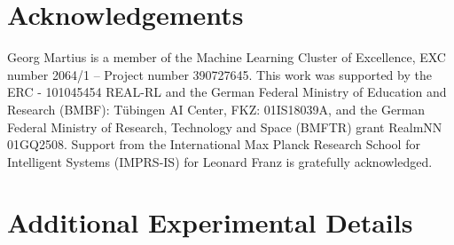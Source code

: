 \documentclass{article}
\begin{document}
    
    \clearpage
    
    \section{Acknowledgements}
	Georg Martius is a member of the Machine Learning Cluster of Excellence, EXC number 2064/1 – Project number 390727645.
	This work was supported by the ERC - 101045454 REAL-RL and the German Federal Ministry of Education and Research (BMBF): Tübingen AI Center, FKZ: 01IS18039A, and the German Federal Ministry of Research, Technology and Space (BMFTR) grant RealmNN 01GQ2508.
	Support from the International Max Planck Research School for Intelligent Systems (IMPRS-IS) for Leonard Franz is gratefully acknowledged.
    
    

    \FloatBarrier
    \clearpage
    \appendix
    
    \section{Additional Experimental Details}
    \label{app:experimental-details}
    
\end{document}
